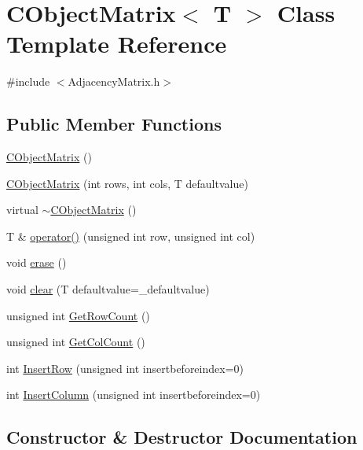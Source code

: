 \hypertarget{class_c_object_matrix}{}\section{C\+Object\+Matrix$<$ T $>$ Class Template Reference}
\label{class_c_object_matrix}


{\ttfamily \#include $<$Adjacency\+Matrix.\+h$>$}

\subsection*{Public Member Functions}
\begin{DoxyCompactItemize}
\item 
\hyperlink{class_c_object_matrix_a5d9e860f4c2a6864bafb123ab396e455}{C\+Object\+Matrix} ()
\item 
\hyperlink{class_c_object_matrix_aa10bf2a18b3f99e74256a50633ea4d03}{C\+Object\+Matrix} (int rows, int cols, T defaultvalue)
\item 
virtual \hyperlink{class_c_object_matrix_a0e6b56d59a82f1c2aeb1a178de28e6d7}{$\sim$\+C\+Object\+Matrix} ()
\item 
T \& \hyperlink{class_c_object_matrix_a44f16fa867d3bf403a6d687a314a886f}{operator()} (unsigned int row, unsigned int col)
\item 
void \hyperlink{class_c_object_matrix_afc881071fd311469ea27960b5090daee}{erase} ()
\item 
void \hyperlink{class_c_object_matrix_a1475e93a3e3de3809ad757979b2cc468}{clear} (T defaultvalue=\+\_\+defaultvalue)
\item 
unsigned int \hyperlink{class_c_object_matrix_a5c1563c9c7b468e8b620387fc3764ccb}{Get\+Row\+Count} ()
\item 
unsigned int \hyperlink{class_c_object_matrix_ac1aec9948ebdf326113b35a34cf39d1b}{Get\+Col\+Count} ()
\item 
int \hyperlink{class_c_object_matrix_a1bcce59fc45a6988f2760ec406b88144}{Insert\+Row} (unsigned int insertbeforeindex=0)
\item 
int \hyperlink{class_c_object_matrix_a75051b1d4e44d6eb3ecc1370a7112157}{Insert\+Column} (unsigned int insertbeforeindex=0)
\end{DoxyCompactItemize}


\subsection{Constructor \& Destructor Documentation}
\hypertarget{class_c_object_matrix_a5d9e860f4c2a6864bafb123ab396e455}{}
